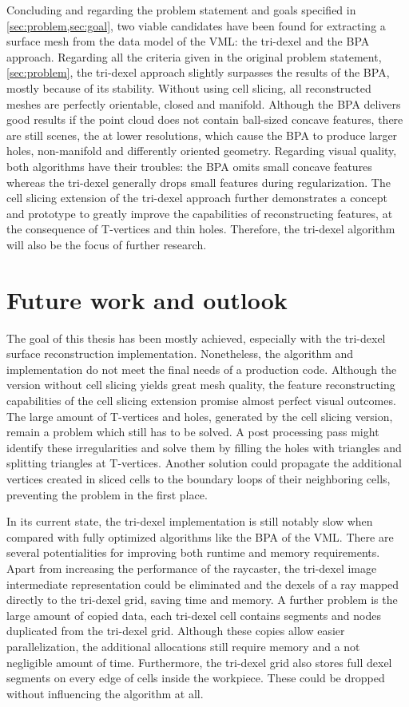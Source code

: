 Concluding and regarding the problem statement and goals specified in \cref{sec:problem,sec:goal}, two viable candidates have been found for extracting a surface mesh from the data model of the VML: the tri-dexel and the BPA approach.
Regarding all the criteria given in the original problem statement, \cf \cref{sec:problem}, the tri-dexel approach slightly surpasses the results of the BPA, mostly because of its stability.
Without using cell slicing, all reconstructed meshes are perfectly orientable, closed and manifold.
Although the BPA delivers good results if the point cloud does not contain ball-sized concave features, there are still scenes, \cf the \turbine at lower resolutions, which cause the BPA to produce larger holes, non-manifold and differently oriented geometry.
Regarding visual quality, both algorithms have their troubles: the BPA omits small concave features whereas the tri-dexel generally drops small features during regularization.
The cell slicing extension of the tri-dexel approach further demonstrates a concept and prototype to greatly improve the capabilities of reconstructing features, at the consequence of T-vertices and thin holes.
Therefore, the tri-dexel algorithm will also be the focus of further research.


\section{Future work and outlook}
\label{sec:outlook}

The goal of this thesis has been mostly achieved, especially with the tri-dexel surface reconstruction implementation.
Nonetheless, the algorithm and implementation do not meet the final needs of a production code.
Although the version without cell slicing yields great mesh quality, the feature reconstructing capabilities of the cell slicing extension promise almost perfect visual outcomes.
The large amount of T-vertices and holes, generated by the cell slicing version, remain a problem which still has to be solved.
A post processing pass might identify these irregularities and solve them by filling the holes with triangles and splitting triangles at T-vertices.
Another solution could propagate the additional vertices created in sliced cells to the boundary loops of their neighboring cells, preventing the problem in the first place.

In its current state, the tri-dexel implementation is still notably slow when compared with fully optimized algorithms like the BPA of the VML.
There are several potentialities for improving both runtime and memory requirements.
Apart from increasing the performance of the raycaster, the tri-dexel image intermediate representation could be eliminated and the dexels of a ray mapped directly to the tri-dexel grid, saving time and memory.
A further problem is the large amount of copied data, \eg each tri-dexel cell contains segments and nodes duplicated from the tri-dexel grid.
Although these copies allow easier parallelization, the additional allocations still require memory and a not negligible amount of time.
Furthermore, the tri-dexel grid also stores full dexel segments on every edge of cells inside the workpiece.
These could be dropped without influencing the algorithm at all.

